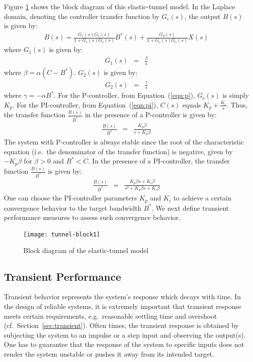 \documentclass{article}
\begin{document}
\noindent
Figure \ref{fig:block1} shows the block diagram 
of this elastic-tunnel model.
In the Laplace domain,
denoting the controller transfer
function by $G_c(s)$, 
the output $B(s)$ is given by:
{\small
\begin{eqnarray} 
 \label{eqn:tf} B(s)= \frac{G_c(s)G_1(s)}{1+G_c(s)G_1(s)} B^*(s) +
   \frac{G_2(s)}{1+G_c(s)G_1(s)} X(s)
\end{eqnarray}
}
where $G_1(s)$ is given by:
\begin{eqnarray*} 
 \label{eqn:g1}    
   G_1(s) &=& \frac{\beta}{s}
\end{eqnarray*}
where $\beta = \alpha (C-B^*)$.
$G_2(s)$ is given by:
\begin{eqnarray*} 
 \label{eqn:g2}    
   G_2(s) &=& \frac{\gamma}{s}
\end{eqnarray*}
where $\gamma = -\alpha B^*$.
\noindent
For the P-controller, 
from Equation~(\ref{eqn:p}), $G_c(s)$ is simply $K_p$.
For the PI-controller, from Equation~(\ref{eqn:pi}),
$C(s)$
equals  $K_p + \frac{K_i}{s}$.
Thus,
the transfer function $\frac{B(s)}{B^*}$ 
in the presence of a  P-controller
is given by:
\begin{eqnarray*} 
 \label{eqn:tfp}    
    \frac{B(s)}{B^*} &=& \frac{K_p \beta}{s + K_p \beta}
\end{eqnarray*}
The system with P-controller is always stable
since the root of the characteristic equation 
(i.e.\ the denominator of the transfer function) is
negative, given by $-K_p \beta$ for $\beta > 0$ and $B^* < C$.
\noindent
In the presence of a PI-controller,
the transfer function $\frac{B(s)}{B^*}$ 
is given by: 
\begin{eqnarray*} 
 \label{eqn:tfpi} 
 \frac{B(s)}{B^*} &=& \frac{K_p\beta s + K_i\beta}
{s^2 + K_p\beta s + K_i\beta}
\end{eqnarray*}
One can choose the PI-controller parameters
$K_p$ and $K_i$ to achieve a certain convergence
behavior to the target bandwidth $B^*$.
We next define transient performance measures
to assess such convergence behavior.

\begin{figure}[htbp] %
   \centering
   \texttt{[image: tunnel-block1]} 
\caption{Block diagram of the elastic-tunnel model} 
\label{fig:block1}
\end{figure}

\subsection{Transient Performance}
Transient behavior represents the system's response 
which decays with
time. 
In the design of reliable systems,
it is extremely important 
that transient response meets certain requirements, 
e.g.\ reasonable settling time and overshoot (cf.\ Section~\ref{sec:transient}). 
Often times, the transient response is
obtained by subjecting the system to an impulse or a step input and
observing the output(s).
One has to guarantee that the response of the
system to specific inputs does not render the system
unstable or pushes it away from its intended target.
\end{document}
